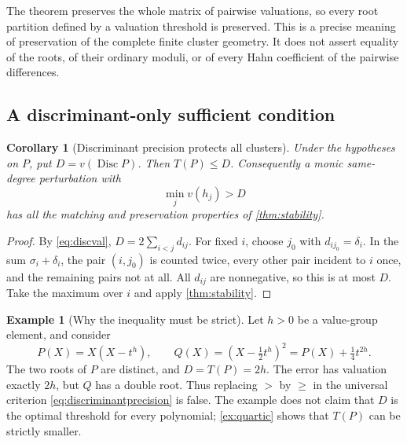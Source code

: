 \documentclass[11pt,letterpaper]{article}
\numberwithin{equation}{section}
\newtheorem{corollary}[corollary]{Corollary}
\theoremstyle{definition}
\newtheorem{example}[example]{Example}
\theoremstyle{remark}
\newcommand{\Disc}{\operatorname{Disc}}
\begin{document}
The theorem preserves the whole matrix of pairwise valuations, so every
root partition defined by a valuation threshold is preserved. This is a
precise meaning of preservation of the complete finite cluster geometry.
It does not assert equality of the roots, of their ordinary moduli, or of
every Hahn coefficient of the pairwise differences.

\subsection{A discriminant-only sufficient condition}
\begin{corollary}[Discriminant precision protects all clusters]\label{cor:discprecision}
Under the hypotheses on $P$, put $D=v(\Disc P)$. Then $T(P)\le D$.
Consequently a monic same-degree perturbation with
\begin{equation}\label{eq:discriminantprecision}
 \min_jv(h_j)>D
\end{equation}
has all the matching and preservation properties of
\cref{thm:stability}.
\end{corollary}
\begin{proof}
By \eqref{eq:discval}, $D=2\sum_{i<j}d_{ij}$. For fixed $i$, choose
$j_0$ with $d_{ij_0}=\delta_i$. In the sum $\sigma_i+\delta_i$, the
pair $(i,j_0)$ is counted twice, every other pair incident to $i$ once,
and the remaining pairs not at all. All $d_{ij}$ are nonnegative, so this
is at most $D$. Take the maximum over $i$ and apply
\cref{thm:stability}.
\end{proof}

\begin{example}[Why the inequality must be strict]\label{ex:sharpdisc}
Let $h>0$ be a value-group element, and consider
\[
 P(X)=X(X-t^h),\qquad
 Q(X)=(X-\tfrac12t^h)^2=P(X)+\tfrac14t^{2h}.
\]
The two roots of $P$ are distinct, and
$D=T(P)=2h$. The error has valuation exactly $2h$, but $Q$ has a double
root. Thus replacing $>$ by $\ge$ in the universal criterion
\eqref{eq:discriminantprecision} is false. The example does not claim that
$D$ is the optimal threshold for every polynomial; \cref{ex:quartic}
shows that $T(P)$ can be strictly smaller.
\end{example}
\end{document}
